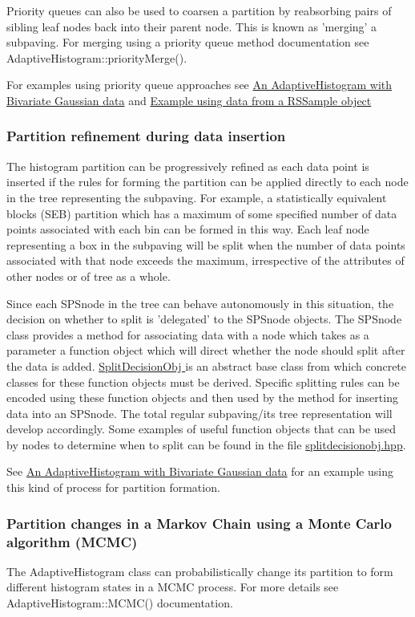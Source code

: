\-Priority queues can also be used to coarsen a partition by reabsorbing pairs of sibling leaf nodes back into their parent node. \-This is known as 'merging' a subpaving. \-For merging using a priority queue method documentation see \-Adaptive\-Histogram\-::priority\-Merge().

\-For examples using priority queue approaches see \hyperlink{AdaptiveHistograms_adhsubsec_exambivg}{\-An \-Adaptive\-Histogram with \-Bivariate \-Gaussian data} and \hyperlink{AdaptiveHistograms_adhsubsec_examLevy}{\-Example using data from a \-R\-S\-Sample object}\hypertarget{AdaptiveHistograms_adhsubsec_onebyone}{}\subsubsection{\-Partition refinement during data insertion}\label{AdaptiveHistograms_adhsubsec_onebyone}
\-The histogram partition can be progressively refined as each data point is inserted if the rules for forming the partition can be applied directly to each node in the tree representing the subpaving. \-For example, a statistically equivalent blocks (\-S\-E\-B) partition which has a maximum of some specified number of data points associated with each bin can be formed in this way. \-Each leaf node representing a box in the subpaving will be split when the number of data points associated with that node exceeds the maximum, irrespective of the attributes of other nodes or of tree as a whole.

\-Since each \-S\-P\-Snode in the tree can behave autonomously in this situation, the decision on whether to split is 'delegated' to the \-S\-P\-Snode objects. \-The \-S\-P\-Snode class provides a method for associating data with a node which takes as a parameter a function object which will direct whether the node should split after the data is added. \hyperlink{classsubpavings_1_1SplitDecisionObj}{\-Split\-Decision\-Obj } is an abstract base class from which concrete classes for these function objects must be derived. \-Specific splitting rules can be encoded using these function objects and then used by the method for inserting data into an \-S\-P\-Snode. \-The total regular subpaving/its tree representation will develop accordingly. \-Some examples of useful function objects that can be used by nodes to determine when to split can be found in the file \hyperlink{splitdecisionobj_8hpp}{splitdecisionobj.\-hpp}.

\-See \hyperlink{AdaptiveHistograms_adhsubsec_exambivg}{\-An \-Adaptive\-Histogram with \-Bivariate \-Gaussian data} for an example using this kind of process for partition formation.\hypertarget{AdaptiveHistograms_adhsubsec_mcmc}{}\subsubsection{\-Partition changes in a Markov Chain using a Monte Carlo algorithm (\-M\-C\-M\-C)}\label{AdaptiveHistograms_adhsubsec_mcmc}
\-The \-Adaptive\-Histogram class can probabilistically change its partition to form different histogram states in a \-M\-C\-M\-C process. \-For more details see \-Adaptive\-Histogram\-::\-M\-C\-M\-C() documentation.



